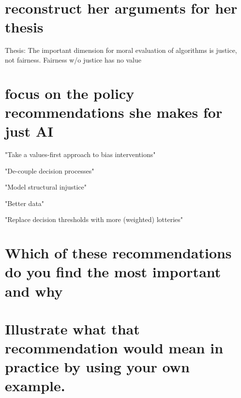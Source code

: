 \section*{reconstruct her arguments for her thesis}

Thesis: The important dimension for moral evaluation of algorithms is justice, not fairness.
Fairness w/o justice has no value

\section*{focus on the policy recommendations she makes for just AI}



"Take a values-first approach to bias interventions"~\parencite[][20]{vredenburgh}

"De-couple decision processes"~\parencite[][22]{vredenburgh}

"Model structural injustice"~\parencite[][23]{vredenburgh}

"Better data"~\parencite[][24]{vredenburgh}

"Replace decision thresholds with more (weighted) lotteries"~\parencite[][24]{vredenburgh}



\section*{Which of these recommendations do you find the most important and why}

\section*{Illustrate what that recommendation would mean in practice by using your own example.}

